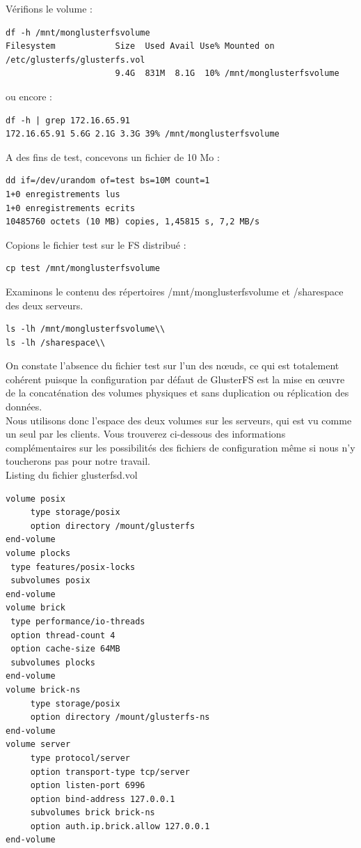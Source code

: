 \documentclass[12pt]{report}
\begin{document}
Vérifions le volume :
\begin{lstlisting}
df -h /mnt/monglusterfsvolume
Filesystem            Size  Used Avail Use% Mounted on
/etc/glusterfs/glusterfs.vol
                      9.4G  831M  8.1G  10% /mnt/monglusterfsvolume
	  \end{lstlisting}
ou encore :
\begin{lstlisting}
df -h | grep 172.16.65.91
172.16.65.91 5.6G 2.1G 3.3G 39% /mnt/monglusterfsvolume
	  \end{lstlisting}
A des fins de test, concevons un fichier de 10 Mo :
\begin{lstlisting}
dd if=/dev/urandom of=test bs=10M count=1
1+0 enregistrements lus
1+0 enregistrements ecrits
10485760 octets (10 MB) copies, 1,45815 s, 7,2 MB/s
	  \end{lstlisting}
Copions le fichier test sur le FS distribué :
\begin{lstlisting}
cp test /mnt/monglusterfsvolume
	  \end{lstlisting}
Examinons le contenu des répertoires /mnt/monglusterfsvolume et /sharespace des deux serveurs.\\
\begin{lstlisting}
ls -lh /mnt/monglusterfsvolume\\
ls -lh /sharespace\\
\end{lstlisting}
On constate l'absence du fichier test sur l'un des nœuds, ce qui est totalement cohérent puisque la configuration par défaut de GlusterFS est la mise en œuvre de la concaténation des volumes physiques et sans duplication ou réplication des données.\\
Nous utilisons donc l'espace des deux volumes sur les serveurs, qui est vu comme un seul par les clients.
Vous trouverez ci-dessous des informations complémentaires sur les possibilités des fichiers de configuration même si nous n'y toucherons pas pour notre travail.\\
\newpage
Listing du fichier glusterfsd.vol
\begin{lstlisting}
volume posix
     type storage/posix
     option directory /mount/glusterfs
end-volume
volume plocks
 type features/posix-locks
 subvolumes posix
end-volume
volume brick
 type performance/io-threads
 option thread-count 4
 option cache-size 64MB
 subvolumes plocks
end-volume
volume brick-ns
     type storage/posix
     option directory /mount/glusterfs-ns
end-volume
volume server
     type protocol/server
     option transport-type tcp/server
     option listen-port 6996
     option bind-address 127.0.0.1
     subvolumes brick brick-ns
     option auth.ip.brick.allow 127.0.0.1
end-volume
	  \end{lstlisting}
\end{document}
